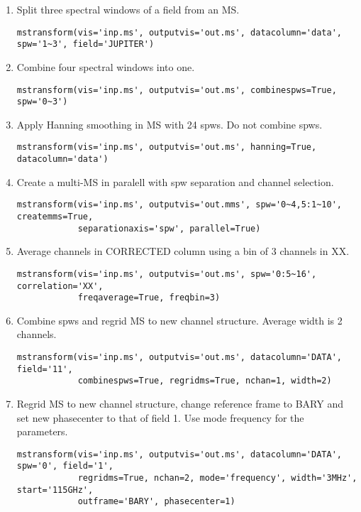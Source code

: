 \begin{enumerate}
\item Split three spectral windows of a field from an MS.
\begin{verbatim}
mstransform(vis='inp.ms', outputvis='out.ms', datacolumn='data', spw='1~3', field='JUPITER')
\end{verbatim}
\item Combine four spectral windows into one.
\begin{verbatim}
mstransform(vis='inp.ms', outputvis='out.ms', combinespws=True, spw='0~3')
\end{verbatim}
\item Apply Hanning smoothing in MS with 24 spws. Do not combine spws.
\begin{verbatim}
mstransform(vis='inp.ms', outputvis='out.ms', hanning=True, datacolumn='data')
\end{verbatim}
\item Create a multi-MS in paralell with spw separation and channel selection.
\begin{verbatim}
mstransform(vis='inp.ms', outputvis='out.mms', spw='0~4,5:1~10', createmms=True,
            separationaxis='spw', parallel=True)
\end{verbatim}
\item Average channels in CORRECTED column using a bin of 3 channels in XX.
\begin{verbatim}
mstransform(vis='inp.ms', outputvis='out.ms', spw='0:5~16', correlation='XX', 
            freqaverage=True, freqbin=3)
\end{verbatim}
\item Combine spws and regrid MS to new channel structure. Average width is 2 channels.
\begin{verbatim}
mstransform(vis='inp.ms', outputvis='out.ms', datacolumn='DATA', field='11',
            combinespws=True, regridms=True, nchan=1, width=2)
\end{verbatim}
\item Regrid MS to new channel structure, change reference frame to BARY and set
new phasecenter to that of field 1. Use mode frequency for the parameters.
\begin{verbatim}
mstransform(vis='inp.ms', outputvis='out.ms', datacolumn='DATA', spw='0', field='1', 
            regridms=True, nchan=2, mode='frequency', width='3MHz', start='115GHz', 
            outframe='BARY', phasecenter=1)
\end{verbatim}



\end{enumerate}

